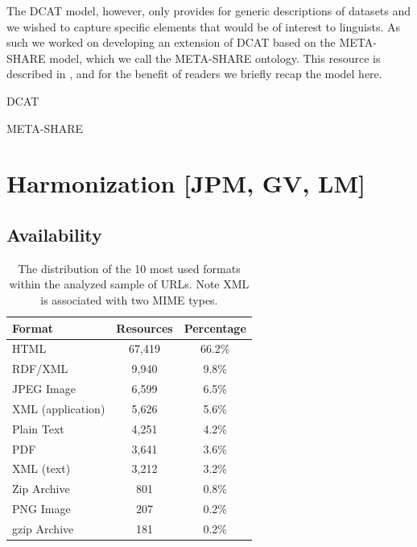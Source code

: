 \documentclass[smallextended]{svjour3}       %
\begin{document}
The DCAT model, however, only provides for generic descriptions of datasets and
we wished to capture specific elements that would be of interest to linguists.
As such we worked on developing an extension of DCAT based on the META-SHARE
model, which we call the META-SHARE ontology. This resource is described in
\cite{mccrae2015ontology}, and for the benefit of readers we briefly recap the
model here.

DCAT

META-SHARE

\section{Harmonization [JPM, GV, LM]}

\label{harmonization}

\subsection{Availability}

\begin{table}
    \begin{center}
	\begin{tabular}{l|cc}
            Format   & Resources  & Percentage\\
		
		\hline                                              
                HTML                &	67,419 & 66.2\%\\
                RDF/XML             &	9,940  & 9.8\% \\
                JPEG Image          &   6,599  & 6.5\% \\
                XML (application)   &	5,626  & 5.6\% \\
                Plain Text          & 4,251    & 4.2\% \\
                PDF                 &	3,641  & 3.6\% \\
                XML (text)          & 3,212    & 3.2\% \\
                Zip Archive         &	801    & 0.8\% \\
                PNG Image           & 207      & 0.2\% \\
                gzip Archive        & 181      & 0.2\% \\
	\end{tabular}
    \end{center}
	\caption{\label{tab:formats}The distribution of the 10 most used formats within the
        analyzed sample of URLs. Note XML is associated with two MIME types.}
\end{table}
\end{document}

